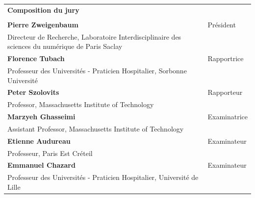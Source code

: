 \documentclass[french,12pt,twoside,a4paper]{book}
\begin{document}
\begin{titlepage}
  \scriptsize
  \begin{tabular}{|p{9cm}l}
    \arrayrulecolor{Prune}
    {\footnotesize \textbf{Composition du jury}}                                                                    \\
                                                                                                     &              \\
    \textbf{Pierre Zweigenbaum}                                                                      & Président    \\
    Directeur de Recherche, Laboratoire Interdisciplinaire des sciences du numérique de Paris Saclay &              \\
    \textbf{Florence Tubach}                                                                         & Rapportrice  \\
    Professeur des Universités - Praticien Hospitalier, Sorbonne Université                          &              \\
    \textbf{Peter Szolovits}                                                                         & Rapporteur   \\
    Professor, Massachusetts Institute of Technology                                                 &              \\
    \textbf{Marzyeh Ghasseimi}                                                                       & Examinatrice \\
    Assistant Professor, Massachusetts Institute of Technology                                       &              \\
    \textbf{Etienne Audureau}                                                                        & Examinateur  \\
    Professeur, Paris Est Créteil                                                                    &              \\
    \textbf{Emmanuel Chazard}                                                                        & Examinateur  \\
    Professeur des Universités - Praticien Hospitalier, Université de Lille                          &              \\
  \end{tabular}


\end{titlepage}
\end{document}
